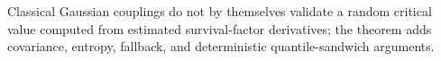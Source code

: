 Classical Gaussian couplings do not by themselves validate a random critical value computed from estimated survival-factor derivatives; the theorem adds covariance, entropy, fallback, and deterministic quantile-sandwich arguments.